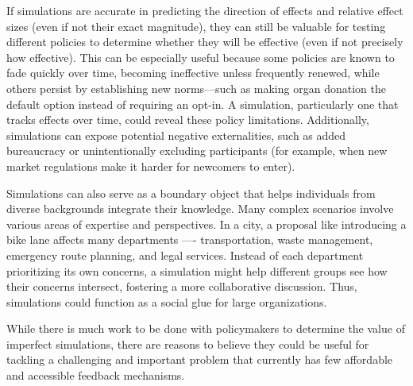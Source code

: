 If simulations are accurate in predicting the direction of effects and relative effect sizes (even if not their exact magnitude), they can still be valuable for testing different policies to determine whether they will be effective (even if not precisely how effective). This can be especially useful because some policies are known to fade quickly over time, becoming ineffective unless frequently renewed, while others persist by establishing new norms—such as making organ donation the default option instead of requiring an opt-in. A simulation, particularly one that tracks effects over time, could reveal these policy limitations. Additionally, simulations can expose potential negative externalities, such as added bureaucracy or unintentionally excluding participants (for example, when new market regulations make it harder for newcomers to enter).

Simulations can also serve as a boundary object that helps individuals from diverse backgrounds integrate their knowledge. Many complex scenarios involve various areas of expertise and perspectives. In a city, a proposal like introducing a bike lane affects many departments —- transportation, waste management, emergency route planning, and legal services. Instead of each department prioritizing its own concerns, a simulation might help different groups see how their concerns intersect, fostering a more collaborative discussion. Thus, simulations could function as a social glue for large organizations.

While there is much work to be done with policymakers to determine the value of imperfect simulations, there are reasons to believe they could be useful for tackling a challenging and important problem that currently has few affordable and accessible feedback mechanisms.



